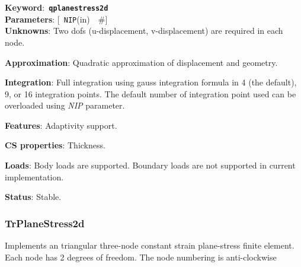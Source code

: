 \documentclass[a4paper]{article}
\newcommand{\descitem}[1]{{\noindent \bf #1}:}
\newcommand{\elemkeyword}[1]{\descitem{Keyword}~{\bf \texttt{#1}}}
\newcommand{\elemparam}[2]{{{\texttt{#1}\tiny (#2)}~~\#}}
\newcommand{\optelemparam}[2]{{[~\elemparam{#1}{#2}]}}
\newcommand{\param}[1]{{\em #1}}
\begin{document}
\elemkeyword{qplanestress2d}\\
\descitem{Parameters} \optelemparam{NIP}{in}\\
\descitem{Unknowns}
Two dofs (u-displacement, v-displacement) are required in each node.

\descitem{Approximation} Quadratic approximation of displacement and
geometry.

\descitem{Integration}
Full integration using gauss integration formula
in 4 (the default), 9, or 16 integration points. The default number of
integration point used can be overloaded using \param{NIP} parameter.

\descitem{Features} Adaptivity support.

\descitem{CS properties} Thickness. 

\descitem{Loads} Body loads are supported. Boundary loads are
not supported in current implementation.

\descitem{Status} Stable.

\subsubsection{TrPlaneStress2d}
Implements an triangular three-node  constant strain plane-stress  
finite element. Each node has 2 degrees of freedom.
The node numbering is anti-clockwise
\end{document}

